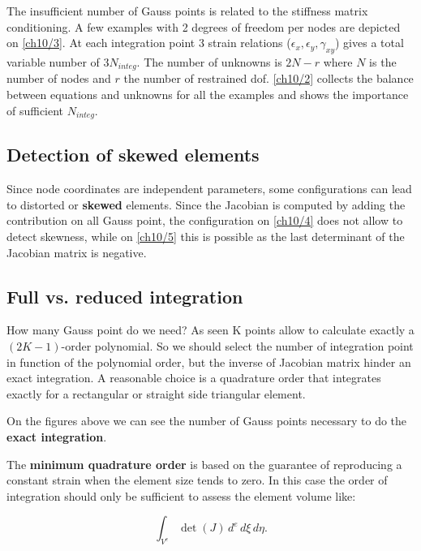 	The insufficient number of Gauss points is related to the stiffness matrix conditioning. A few examples with 2 degrees of freedom per nodes are depicted on \autoref{ch10/3}. At each integration point 3 strain relations ($\epsilon _x, \epsilon _y, \gamma _{xy}$) gives a total variable number of $3N_{integ}$. The number of unknowns is $2N-r$ where $N$ is the number of nodes and $r$ the number of restrained dof. \autoref{ch10/2} collects the balance between equations and unknowns for all the examples and shows the importance of sufficient $N_{integ}$. 
	
\subsection{Detection of skewed elements}
	Since node coordinates are independent parameters, some configurations can lead to distorted or \textbf{skewed} elements. Since the Jacobian is computed by adding the contribution on all Gauss point, the configuration on \autoref{ch10/4} does not allow to detect skewness, while on \autoref{ch10/5} this is possible as the last determinant of the Jacobian matrix is negative. 
	
\subsection{Full vs. reduced integration}
	How many Gauss point do we need? As seen K points allow to calculate exactly a $(2K-1)$-order polynomial. So we should select the number of integration point in function of the polynomial order, but the inverse of Jacobian matrix hinder an exact integration. A reasonable choice is a quadrature order that integrates exactly for a rectangular or straight side triangular element. 
	
	
	On the figures above we can see the number of Gauss points necessary to do the \textbf{exact integration}. 
	
	The \textbf{minimum quadrature order} is based on the guarantee of reproducing a constant strain when the element size tends to zero. In this case the order of integration should only be sufficient to assess the element volume like: 
	
	\begin{equation}
	\int _{V^e} \det (J) \, d^e\, d\xi \, d\eta.
	\end{equation}
	
